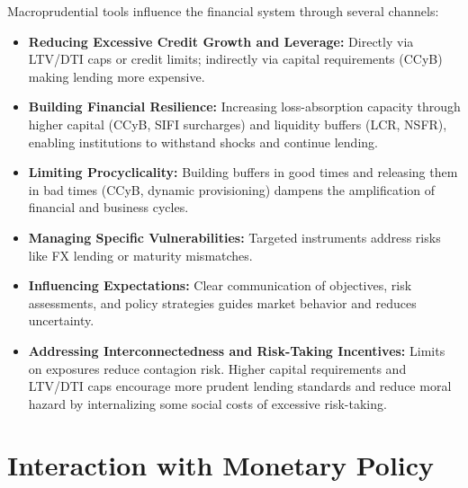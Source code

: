 Macroprudential tools influence the financial system through several channels:
\begin{itemize}
    \item \textbf{Reducing Excessive Credit Growth and Leverage:} Directly via LTV/DTI caps or credit limits; indirectly via capital requirements (CCyB) making lending more expensive.
    \item \textbf{Building Financial Resilience:} Increasing loss-absorption capacity through higher capital (CCyB, SIFI surcharges) and liquidity buffers (LCR, NSFR), enabling institutions to withstand shocks and continue lending.
    \item \textbf{Limiting Procyclicality:} Building buffers in good times and releasing them in bad times (CCyB, dynamic provisioning) dampens the amplification of financial and business cycles.
    \item \textbf{Managing Specific Vulnerabilities:} Targeted instruments address risks like FX lending or maturity mismatches.
    \item \textbf{Influencing Expectations:} Clear communication of objectives, risk assessments, and policy strategies guides market behavior and reduces uncertainty.
    \item \textbf{Addressing Interconnectedness and Risk-Taking Incentives:} Limits on exposures reduce contagion risk. Higher capital requirements and LTV/DTI caps encourage more prudent lending standards and reduce moral hazard by internalizing some social costs of excessive risk-taking.
\end{itemize}

\section{Interaction with Monetary Policy}

